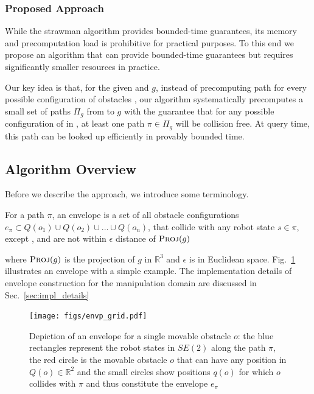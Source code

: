 \documentclass[a4paper]{report}
\begin{document}
\subsubsection{Proposed Approach}
While the strawman algorithm provides bounded-time guarantees, its memory and precomputation load is prohibitive for practical purposes. To this end we propose an algorithm that can provide bounded-time guarantees but requires significantly smaller resources in practice.

Our key idea is that, for the given \Sstart and $g$, instead of precomputing path for every possible configuration of obstacles \calO, our algorithm systematically precomputes a small set of paths $\Pi_g$ from \Sstart to $g$ with the guarantee that for any possible configuration of \calO in \calW, at least one path $\pi \in \Pi_g$ will be collision free. At query time, this path can be looked up efficiently in provably bounded time.

\subsection{Algorithm Overview}
Before we describe the approach, we introduce some terminology.

\begin{definition}[Envelope]
\label{def:envp}
For a path $\pi$, an envelope is a set of all obstacle configurations $e_\pi \subset Q(o_1) \cup Q(o_2) \cup...\cup Q(o_n)$, that collide with any robot state $s \in \pi$, except \Sstart, and are not within $\epsilon$ distance of $\textsc{Proj}(g)$
\end{definition}

\noindent where $\textsc{Proj}(g)$ is the projection of $g$ in $\mathbb{R}^3$ and $\epsilon$ is in Euclidean space. Fig.~\ref{fig:envp} illustrates an envelope with a simple example.
The implementation details of envelope construction for the manipulation domain are discussed in Sec.~\ref{sec:impl_details}

\begin{figure}[bt]
\centering
\texttt{[image: figs/envp\_grid.pdf]}
\caption{Depiction of an envelope for a single movable obstacle $o$: the blue rectangles represent the robot states in $SE(2)$ along the path $\pi$, the red circle is the movable obstacle $o$ that can have any position in $Q(o) \in \mathbb{R}^2$ and the small circles show positions $q(o)$ for which $o$ collides with $\pi$ and thus constitute the envelope $e_\pi$}
\label{fig:envp}
\end{figure}
\end{document}
